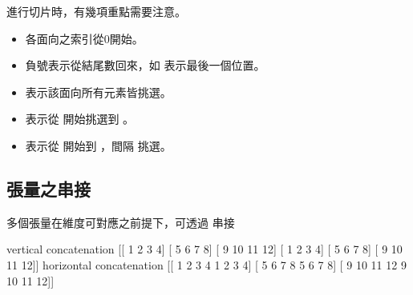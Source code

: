 \documentclass[letterpaper,10pt,english]{sphinxmanual}
\begin{document}
進行切片時，有幾項重點需要注意。
\begin{itemize}
\item {} 
各面向之索引從0開始。

\item {} 
負號表示從結尾數回來，如  表示最後一個位置。

\item {} 
\sphinxcode{\sphinxupquote{:}}表示該面向所有元素皆挑選。

\item {} 
 表示從  開始挑選到 。

\item {} 
 表示從  開始到 ，間隔  挑選。

\end{itemize}


\subsection{張量之串接}
\label{\detokenize{notebook/lab-torch-tensor:id8}}
多個張量在維度可對應之前提下，可透過  串接

\begin{sphinxVerbatim}[commandchars=\\\{\}]
      \PYG{p}{[} \PYG{p}{]}   
      \PYG{p}{[} \PYG{p}{]}   
\end{sphinxVerbatim}

\begin{sphinxVerbatim}[commandchars=\\\{\}]
vertical concatenation 
 [[ 1  2  3  4]
 [ 5  6  7  8]
 [ 9 10 11 12]
 [ 1  2  3  4]
 [ 5  6  7  8]
 [ 9 10 11 12]]
horizontal concatenation 
 [[ 1  2  3  4  1  2  3  4]
 [ 5  6  7  8  5  6  7  8]
 [ 9 10 11 12  9 10 11 12]]
\end{sphinxVerbatim}
\end{document}
